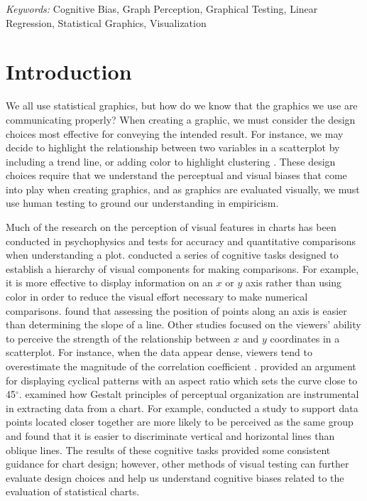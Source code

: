 \documentclass[12pt]{article}
\begin{document}
\noindent%
{\it Keywords:} Cognitive Bias, Graph Perception, Graphical
Testing, Linear Regression, Statistical Graphics, Visualization
\vfill

\newpage
{} %

\hypertarget{introduction}{%
\section{Introduction}\label{introduction}}

We all use statistical graphics, but how do we know that the graphics we
use are communicating properly? When creating a graphic, we must
consider the design choices most effective for conveying the intended
result. For instance, we may decide to highlight the relationship
between two variables in a scatterplot by including a trend line, or
adding color to highlight clustering \citep{vanderplas2017clusters}.
These design choices require that we understand the perceptual and
visual biases that come into play when creating graphics, and as
graphics are evaluated visually, we must use human testing to ground our
understanding in empiricism.

Much of the research on the perception of visual features in charts has
been conducted in psychophysics and tests for accuracy and quantitative
comparisons when understanding a plot. \citet{cleveland1984graphical}
conducted a series of cognitive tasks designed to establish a hierarchy
of visual components for making comparisons. For example, it is more
effective to display information on an \(x\) or \(y\) axis rather than
using color in order to reduce the visual effort necessary to make
numerical comparisons. \citet{cleveland1985graphical} found that
assessing the position of points along an axis is easier than
determining the slope of a line. Other studies focused on the viewers'
ability to perceive the strength of the relationship between \(x\) and
\(y\) coordinates in a scatterplot. For instance, when the data appear
dense, viewers tend to overestimate the magnitude of the correlation
coefficient \citep{cleveland1982variables, lauer1989density}.
\citet{cleveland1993visualizing} provided an argument for displaying
cyclical patterns with an aspect ratio which sets the curve close to
45\(^{\circ}\). \citet{kosslyn2006graph} examined how Gestalt principles
of perceptual organization are instrumental in extracting data from a
chart. For example, \citet{ciccione2020grouping} conducted a study to
support data points located closer together are more likely to be
perceived as the same group and \citet{appelle1972perception} found that
it is easier to discriminate vertical and horizontal lines than oblique
lines. The results of these cognitive tasks provided some consistent
guidance for chart design; however, other methods of visual testing can
further evaluate design choices and help us understand cognitive biases
related to the evaluation of statistical charts.
\end{document}
